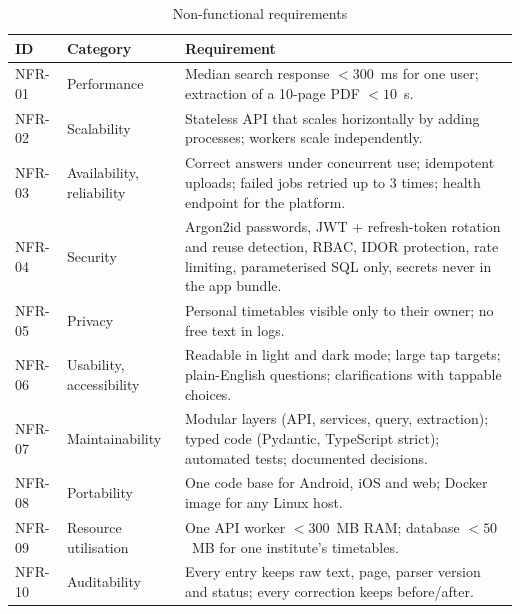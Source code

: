 \begin{table}[H]
\centering
\caption{Non-functional requirements}
\label{tab:nfr}
\small
\begin{tabularx}{\textwidth}{@{}p{1.3cm}p{2.7cm}X@{}}
\toprule
\textbf{ID} & \textbf{Category} & \textbf{Requirement}\\
\midrule
NFR-01 & Performance & Median search response $<300$~ms for one user; extraction of a 10-page PDF $<10$~s.\\
NFR-02 & Scalability & Stateless API that scales horizontally by adding processes; workers scale independently.\\
NFR-03 & Availability, reliability & Correct answers under concurrent use; idempotent uploads; failed jobs retried up to 3 times; health endpoint for the platform.\\
NFR-04 & Security & Argon2id passwords, JWT + refresh-token rotation and reuse detection, RBAC, IDOR protection, rate limiting, parameterised SQL only, secrets never in the app bundle.\\
NFR-05 & Privacy & Personal timetables visible only to their owner; no free text in logs.\\
NFR-06 & Usability, accessibility & Readable in light and dark mode; large tap targets; plain-English questions; clarifications with tappable choices.\\
NFR-07 & Maintainability & Modular layers (API, services, query, extraction); typed code (Pydantic, TypeScript strict); automated tests; documented decisions.\\
NFR-08 & Portability & One code base for Android, iOS and web; Docker image for any Linux host.\\
NFR-09 & Resource utilisation & One API worker $<300$~MB RAM; database $<50$~MB for one institute's timetables.\\
NFR-10 & Auditability & Every entry keeps raw text, page, parser version and status; every correction keeps before/after.\\
\bottomrule
\end{tabularx}
\end{table}
